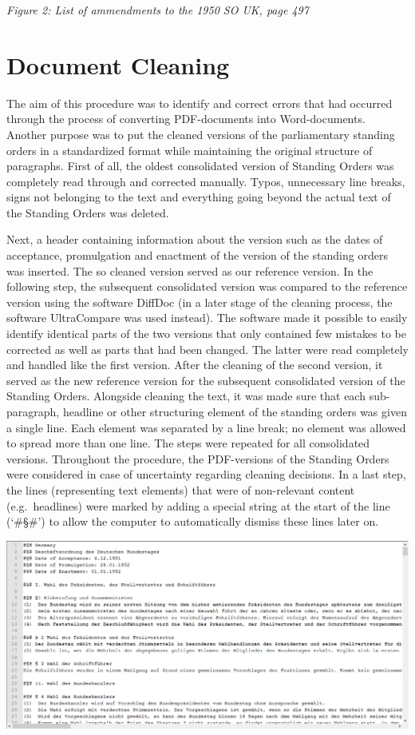 \documentclass[10pt,]{article}
\begin{document}
\emph{Figure 2: List of ammendments to the 1950 SO UK, page 497}

\newpage

\section{Document Cleaning}\label{document-cleaning}

The aim of this procedure was to identify and correct errors that had
occurred through the process of converting PDF-documents into
Word-documents. Another purpose was to put the cleaned versions of the
parliamentary standing orders in a standardized format while maintaining
the original structure of paragraphs. First of all, the oldest
consolidated version of Standing Orders was completely read through and
corrected manually. Typos, unnecessary line breaks, signs not belonging
to the text and everything going beyond the actual text of the Standing
Orders was deleted.

Next, a header containing information about the version such as the
dates of acceptance, promulgation and enactment of the version of the
standing orders was inserted. The so cleaned version served as our
reference version. In the following step, the subsequent consolidated
version was compared to the reference version using the software DiffDoc
(in a later stage of the cleaning process, the software UltraCompare was
used instead). The software made it possible to easily identify
identical parts of the two versions that only contained few mistakes to
be corrected as well as parts that had been changed. The latter were
read completely and handled like the first version. After the cleaning
of the second version, it served as the new reference version for the
subsequent consolidated version of the Standing Orders. Alongside
cleaning the text, it was made sure that each sub-paragraph, headline or
other structuring element of the standing orders was given a single
line. Each element was separated by a line break; no element was allowed
to spread more than one line. The steps were repeated for all
consolidated versions. Throughout the procedure, the PDF-versions of the
Standing Orders were considered in case of uncertainty regarding
cleaning decisions. In a last step, the lines (representing text
elements) that were of non-relevant content (e.g.~headlines) were marked
by adding a special string at the start of the line (`\#§\#') to allow
the computer to automatically dismiss these lines later on.

\begin{center}
\includegraphics[width=\textwidth]{fig/fig2.png}
\end{center}
\end{document}
